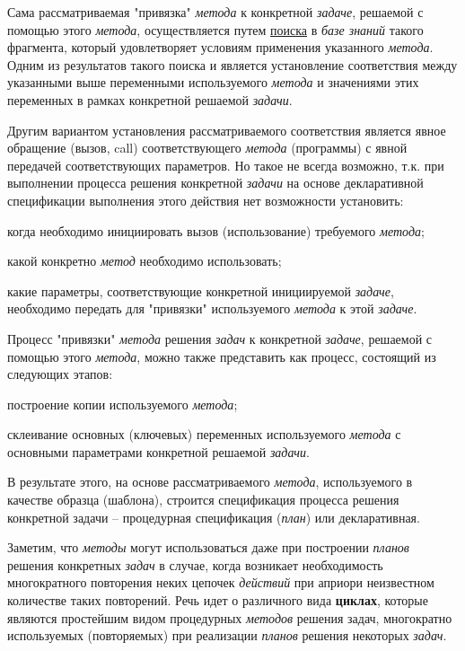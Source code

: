 Сама рассматриваемая "привязка"{} \textit{метода} к конкретной \textit{задаче}, решаемой с помощью этого \textit{метода}, осуществляется путем \underline{поиска} в \textit{базе знаний} такого фрагмента, который удовлетворяет условиям применения указанного \textit{метода}. Одним из результатов такого поиска и является установление соответствия между указанными выше переменными используемого \textit{метода} и значениями этих переменных в рамках конкретной решаемой \textit{задачи}.

Другим вариантом установления рассматриваемого соответствия является явное обращение (вызов, call) соответствующего \textit{метода} (программы) с явной передачей соответствующих параметров. Но такое не всегда возможно, т.к. при выполнении процесса решения конкретной \textit{задачи} на основе декларативной спецификации выполнения этого действия нет возможности установить:
\begin{textitemize}
	\item когда необходимо инициировать вызов (использование) требуемого \textit{метода};
	\item какой конкретно \textit{метод} необходимо использовать;
	\item какие параметры, соответствующие конкретной инициируемой \textit{задаче}, необходимо передать для "привязки"{} используемого \textit{метода} к этой \textit{задаче}.
\end{textitemize}

Процесс "привязки"{} \textit{метода} решения \textit{задач} к конкретной \textit{задаче}, решаемой с помощью этого \textit{метода}, можно также представить как процесс, состоящий из следующих этапов:
\begin{textitemize}
	\item построение копии используемого \textit{метода};
	\item склеивание основных (ключевых) переменных используемого \textit{метода} с основными параметрами конкретной решаемой \textit{задачи}.
\end{textitemize}

В результате этого, на основе рассматриваемого \textit{метода}, используемого в качестве образца (шаблона), строится спецификация процесса решения конкретной задачи -- процедурная спецификация (\textit{план}) или декларативная.

Заметим, что \textit{методы} могут использоваться даже при построении \textit{планов} решения конкретных \textit{задач} в случае, когда возникает необходимость многократного повторения неких цепочек \textit{действий} при априори неизвестном количестве таких повторений. Речь идет о различного вида \textbf{циклах}, которые являются простейшим видом процедурных \textit{методов} решения задач, многократно используемых (повторяемых) при реализации \textit{планов} решения некоторых \textit{задач}.

